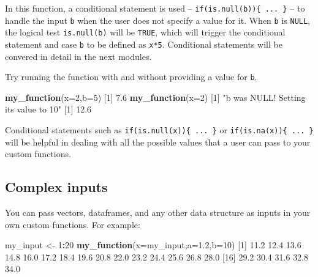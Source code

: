 \documentclass[
]{book}
\newenvironment{Shaded}{\begin{snugshade}}{\end{snugshade}}
\newcommand{\DataTypeTok}[1]{\textcolor[rgb]{0.13,0.29,0.53}{#1}}
\newcommand{\DecValTok}[1]{\textcolor[rgb]{0.00,0.00,0.81}{#1}}
\newcommand{\FloatTok}[1]{\textcolor[rgb]{0.00,0.00,0.81}{#1}}
\newcommand{\KeywordTok}[1]{\textcolor[rgb]{0.13,0.29,0.53}{\textbf{#1}}}
\newcommand{\NormalTok}[1]{#1}
\newcommand{\OperatorTok}[1]{\textcolor[rgb]{0.81,0.36,0.00}{\textbf{#1}}}
\newcommand{\StringTok}[1]{\textcolor[rgb]{0.31,0.60,0.02}{#1}}
\begin{document}
In this function, a conditional statement is used -- \texttt{if(is.null(b))\{\ ...\ \}} -- to handle the input \texttt{b} when the user does not specify a value for it. When \texttt{b} is \texttt{NULL}, the logical test \texttt{is.null(b)} will be \texttt{TRUE}, which will trigger the conditional statement and case \texttt{b} to be defined as \texttt{x*5}. Conditional statements will be convered in detail in the next modules.

Try running the function with and without providing a value for \texttt{b}.

\begin{Shaded}
\begin{Highlighting}[]
\KeywordTok{my_function}\NormalTok{(}\DataTypeTok{x=}\DecValTok{2}\NormalTok{,}\DataTypeTok{b=}\DecValTok{5}\NormalTok{)}
\NormalTok{[}\DecValTok{1}\NormalTok{] }\FloatTok{7.6}
\KeywordTok{my_function}\NormalTok{(}\DataTypeTok{x=}\DecValTok{2}\NormalTok{)}
\NormalTok{[}\DecValTok{1}\NormalTok{] }\StringTok{"b was NULL! Setting its value to  10"}
\NormalTok{[}\DecValTok{1}\NormalTok{] }\FloatTok{12.6}
\end{Highlighting}
\end{Shaded}

Conditional statements such as \texttt{if(is.null(x))\{\ ...\ \}} or \texttt{if(is.na(x))\{\ ...\ \}} will be helpful in dealing with all the possible values that a user can pass to your custom functions.

\hypertarget{complex-inputs}{%
\subsection*{Complex inputs}\label{complex-inputs}}

You can pass vectors, dataframes, and any other data structure as inputs in your own custom functions. For example:

\begin{Shaded}
\begin{Highlighting}[]
\NormalTok{my_input <-}\StringTok{ }\DecValTok{1}\OperatorTok{:}\DecValTok{20}
\KeywordTok{my_function}\NormalTok{(}\DataTypeTok{x=}\NormalTok{my_input,}\DataTypeTok{a=}\FloatTok{1.2}\NormalTok{,}\DataTypeTok{b=}\DecValTok{10}\NormalTok{)}
\NormalTok{ [}\DecValTok{1}\NormalTok{] }\FloatTok{11.2} \FloatTok{12.4} \FloatTok{13.6} \FloatTok{14.8} \FloatTok{16.0} \FloatTok{17.2} \FloatTok{18.4} \FloatTok{19.6} \FloatTok{20.8} \FloatTok{22.0} \FloatTok{23.2} \FloatTok{24.4} \FloatTok{25.6} \FloatTok{26.8} \FloatTok{28.0}
\NormalTok{[}\DecValTok{16}\NormalTok{] }\FloatTok{29.2} \FloatTok{30.4} \FloatTok{31.6} \FloatTok{32.8} \FloatTok{34.0}
\end{Highlighting}
\end{Shaded}
\end{document}
